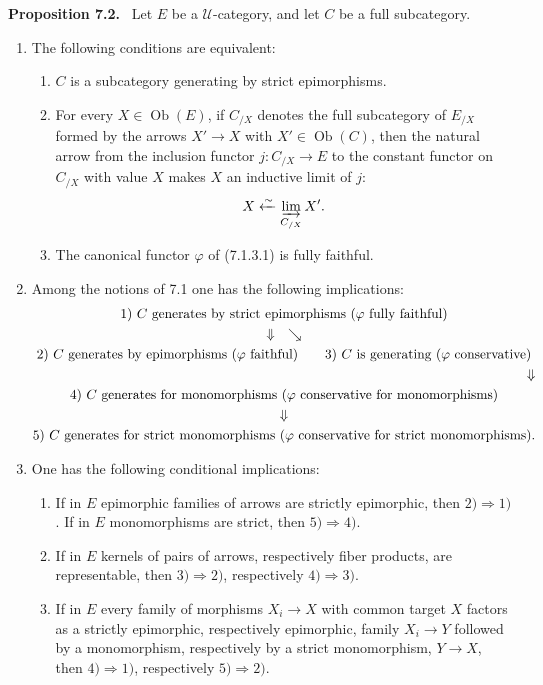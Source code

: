 \documentclass[11pt]{article}
\newcommand{\U}{\mathcal{U}}
\newcommand{\Ob}{\operatorname{Ob}}
\newenvironment{statement}[1]{\par\medskip\noindent\textbf{#1.}\ }{\par\medskip}
\begin{document}
\begin{statement}{Proposition 7.2}
Let $E$ be a $\U$-category, and let $C$ be a full subcategory.
\begin{enumerate}[label=(\roman*)]
\item The following conditions are equivalent:
\begin{enumerate}[label=\alph*)]
\item $C$ is a subcategory generating by strict epimorphisms.
\item For every $X\in\Ob(E)$, if $C_{/X}$ denotes the full subcategory of $E_{/X}$ formed by the arrows $X'\to X$ with $X'\in\Ob(C)$, then the natural arrow from the inclusion functor $j:C_{/X}\to E$ to the constant functor on $C_{/X}$ with value $X$ makes $X$ an inductive limit of $j$:
\[
X\xleftarrow{\sim}\varinjlim_{C_{/X}}X'.
\]
\item The canonical functor $\varphi$ of (7.1.3.1) is fully faithful.
\end{enumerate}

\item Among the notions of 7.1 one has the following implications:
\[
\begin{gathered}
1)\ C\text{ generates by strict epimorphisms }(\varphi\text{ fully faithful})\\
\Downarrow\quad\searrow\\
2)\ C\text{ generates by epimorphisms }(\varphi\text{ faithful})\qquad
3)\ C\text{ is generating }(\varphi\text{ conservative})\\
\hfill\Downarrow\\
4)\ C\text{ generates for monomorphisms }(\varphi\text{ conservative for monomorphisms})\\
\Downarrow\\
5)\ C\text{ generates for strict monomorphisms }(\varphi\text{ conservative for strict monomorphisms}).
\end{gathered}
\]

\item One has the following conditional implications:
\begin{enumerate}[label=\alph*)]
\item If in $E$ epimorphic families of arrows are strictly epimorphic, then $2)\Rightarrow1)$. If in $E$ monomorphisms are strict, then $5)\Rightarrow4)$.
\item If in $E$ kernels of pairs of arrows, respectively fiber products, are representable, then $3)\Rightarrow2)$, respectively $4)\Rightarrow3)$.
\item If in $E$ every family of morphisms $X_i\to X$ with common target $X$ factors as a strictly epimorphic, respectively epimorphic, family $X_i\to Y$ followed by a monomorphism, respectively by a strict monomorphism, $Y\to X$, then $4)\Rightarrow1)$, respectively $5)\Rightarrow2)$.
\end{enumerate}
\end{enumerate}
\end{statement}
\end{document}
